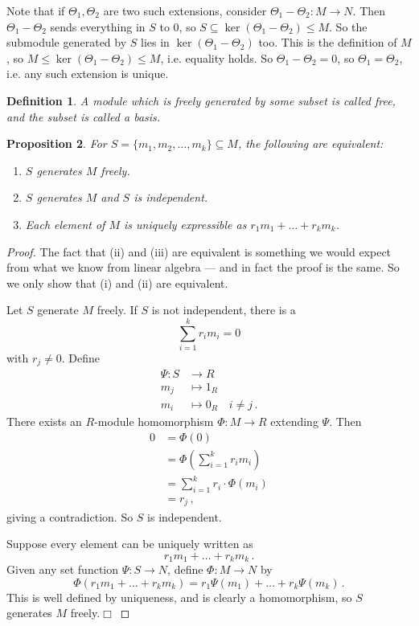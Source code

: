 \documentclass{article}
\theoremstyle{plain}\theoremheaderfont{\normalfont\itshape}\theorembodyfont{\rmfamily}\theoremseparator{.}\newtheorem*{rem}{Remark}\newtheorem*{ex}{Example}\newtheorem*{proof}{Proof}\newtheorem*{altp}{Alternative proof}\newtheorem*{nonex}{Non-Example}
\theoremstyle{plain}\theoremheaderfont{\normalfont\bfseries}\theorembodyfont{\rmfamily}\theoremseparator{.}\newtheorem{thm}{Theorem}[section]\newtheorem{lem}[thm]{Lemma}\newtheorem{prop}[thm]{Proposition}\newtheorem*{cor}{Corollary}\newtheorem{defn}[thm]{Definition}\newtheorem{clm}[thm]{Claim}\newtheorem{clminproof}{Claim}\newtheorem*{notn}{Notation}\newtheorem*{exer}{Exercise}\newtheorem*{lemnn}{Lemma}
\theoremstyle{break}\theoremheaderfont{\normalfont\itshape}\theorembodyfont{\rmfamily}\theoremseparator{.\medskip}\newtheorem*{proofskip}{Proof}\newtheorem*{exs}{Examples}\newtheorem*{rems}{Remarks}\newtheorem*{obs}{Observations}
\theoremstyle{break}\theoremheaderfont{\normalfont\bfseries}\theorembodyfont{\rmfamily}\theoremseparator{.\medskip}\newtheorem{lemskip}[thm]{Lemma}\newtheorem{defnskip}[thm]{Definition}\newtheorem{propskip}[thm]{Proposition}\newtheorem{thmskip}[thm]{Theorem}
\numberwithin{equation}{section}
\newcommand{\qed}{\hfill\ensuremath{\Box}}
\begin{document}
    Note that if \(\Theta_1,\Theta_2\) are two such extensions, consider \(\Theta_1-\Theta_2:M\to N\). Then \(\Theta_1-\Theta_2\) sends everything in \(S\) to \(0\), so \(S\subseteq\ker(\Theta_1-\Theta_2)\le M\). So the submodule generated by \(S\) lies in \(\ker(\Theta_1-\Theta_2)\) too. This is the definition of \(M\), so \(M\le\ker(\Theta_1-\Theta_2)\le M\), i.e. equality holds. So \(\Theta_1-\Theta_2=0\), so \(\Theta_1=\Theta_2\), i.e. any such extension is unique.

    \begin{defn}
        A module which is freely generated by some subset is called \textit{free}, and the subset is called a \textit{basis}.
    \end{defn}
    \begin{prop}
        For \(S=\{m_1,m_2,\dots,m_k\}\subseteq M\), the following are equivalent:
        \begin{enumerate}[topsep=0pt,label=(\roman*)]
            \item \(S\) generates \(M\) freely.
            \item \(S\) generates \(M\) and \(S\) is independent.
            \item Each element of \(M\) is uniquely expressible as \(r_1m_1+\dots+r_km_k\).
        \end{enumerate}
    \end{prop}
    \begin{proof}
        The fact that (ii) and (iii) are equivalent is something we would expect from what we know from linear algebra --- and in fact the proof is the same. So we only show that (i) and (ii) are equivalent.

        Let \(S\) generate \(M\) freely. If \(S\) is not independent, there is a
        \[\sum_{i=1}^{k}r_im_i=0\]
        with \(r_j\ne 0\). Define
        \begin{align*}
            \Psi:S&\longrightarrow R\\
            m_j&\longmapsto 1_R\\
            m_i&\longmapsto 0_R\quad i\ne j\,.
        \end{align*}
        There exists an \(R\)-module homomorphism \(\Phi:M\to R\) extending \(\Psi\). Then
        \begin{align*}
            0&=\Phi(0)\\
            &=\Phi\left(\sum_{i=1}^{k}r_im_i\right)\\
            &=\sum_{i=1}^{k}r_i\cdot\Phi(m_i)\\
            &=r_j\,,
        \end{align*}
        giving a contradiction. So \(S\) is independent.

        Suppose every element can be uniquely written as
        \[r_1m_1+\dots+r_km_k\,.\]
        Given any set function \(\Psi:S\to N\), define \(\Phi:M\to N\) by
        \[\Phi(r_1m_1+\dots+r_km_k)=r_1\Psi(m_1)+\dots+r_k\Psi(m_k)\,.\]
        This is well defined by uniqueness, and is clearly a homomorphism, so \(S\) generates \(M\) freely.\qed
    \end{proof}
\end{document}

